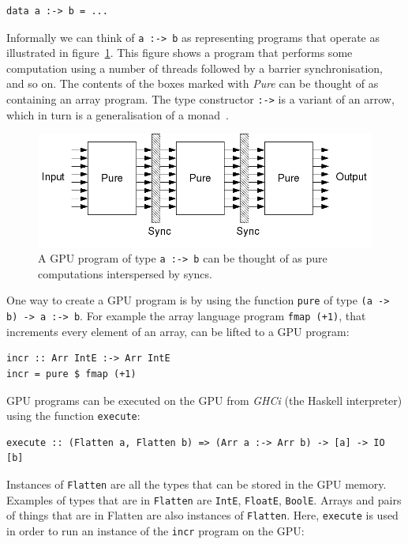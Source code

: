 \begin{small}
\begin{verbatim} 
data a :-> b = ... 
\end{verbatim}
\end{small} 
\noindent
\noindent
Informally we can think of {\tt a\nolinebreak~:->\nolinebreak~b} as representing programs that operate 
as illustrated in figure~\ref{fig:program}. This figure 
shows a program that performs some computation using a number of threads 
followed by a barrier synchronisation, and so on. The contents of the 
boxes marked with {\em Pure} can be thought of as containing an array 
program.%
The type constructor {\tt :->} is a variant of an arrow, which in turn is a generalisation of a monad~\cite{JSTECH}.
%
\begin{figure}
\begin{center}
\includegraphics[width=.60\linewidth]{./papp/pictures/prg_intuit.jpg}
\caption{A GPU program of type  {\tt a :-> b} can be thought 
of as pure computations interspersed by syncs.}
\label{fig:program}
\end{center}
\end{figure}
\noindent
One way to create a GPU program is by using the function {\tt pure} of type {\tt (a -> b) -> a :-> b}.
For example the array language program {\tt fmap (+1)}, that increments 
every element of an array, can be lifted to a GPU program: 
%
\begin{small}
\begin{verbatim}
incr :: Arr IntE :-> Arr IntE 
incr = pure $ fmap (+1)
\end{verbatim}
\end{small} 
 \noindent
GPU programs can be executed on the GPU from
{\em GHCi} (the Haskell interpreter) using the function {\tt execute}: 

\begin{small}
\begin{verbatim}
execute :: (Flatten a, Flatten b) => (Arr a :-> Arr b) -> [a] -> IO [b]
\end{verbatim}
\end{small}
\noindent
Instances of {\tt Flatten} are all the types that can be stored in the 
GPU memory. Examples of types that are in {\tt Flatten} are {\tt IntE}, 
{\tt FloatE}, {\tt BoolE}. Arrays and pairs of things that are in Flatten 
are also instances of {\tt Flatten}.
Here, {\tt execute} is used in order to run an instance of the {\tt incr} 
program on the GPU:

